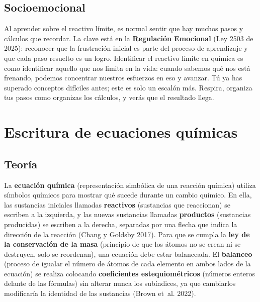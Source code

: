 \documentclass[
  spanish,
  letterpaper,
  12pt,
  oneside,
  open=any]{scrbook}
\newcommand{\setcolorsection}[2]{%
  \definecolor{currentsectionbg}{HTML}{#1}%
  \definecolor{currentsectionborder}{HTML}{#2}%
}
\begin{document}
\setcolorsection{f4c8d8}{e0b0c4}

\section{Socioemocional}\label{socioemocional}

Al aprender sobre el reactivo límite, es normal sentir que hay muchos
pasos y cálculos que recordar. La clave está en la \textbf{Regulación
Emocional} (Ley 2503 de 2025): reconocer que la frustración inicial es
parte del proceso de aprendizaje y que cada paso resuelto es un logro.
Identificar el reactivo límite en química es como identificar aquello
que nos limita en la vida: cuando sabemos qué nos está frenando, podemos
concentrar nuestros esfuerzos en eso y avanzar. Tú ya has superado
conceptos difíciles antes; este es solo un escalón más. Respira,
organiza tus pasos como organizas los cálculos, y verás que el resultado
llega.

\chapter{Escritura de ecuaciones
químicas}\label{escritura-de-ecuaciones-quuxedmicas}

\setcolorsection{e8e8e8}{d0d0d0}

\section{Teoría}\label{teoruxeda-1}

La \textbf{ecuación química} (representación simbólica de una reacción
química) utiliza símbolos químicos para mostrar qué sucede durante un
cambio químico. En ella, las sustancias iniciales llamadas
\textbf{reactivos} (sustancias que reaccionan) se escriben a la
izquierda, y las nuevas sustancias llamadas \textbf{productos}
(sustancias producidas) se escriben a la derecha, separadas por una
flecha que indica la dirección de la reacción (Chang y Goldsby 2017).
Para que se cumpla la \textbf{ley de la conservación de la masa}
(principio de que los átomos no se crean ni se destruyen, solo se
reordenan), una ecuación debe estar balanceada. El \textbf{balanceo}
(proceso de igualar el número de átomos de cada elemento en ambos lados
de la ecuación) se realiza colocando \textbf{coeficientes
estequiométricos} (números enteros delante de las fórmulas) sin alterar
nunca los subíndices, ya que cambiarlos modificaría la identidad de las
sustancias (Brown et~al. 2022).
\end{document}
